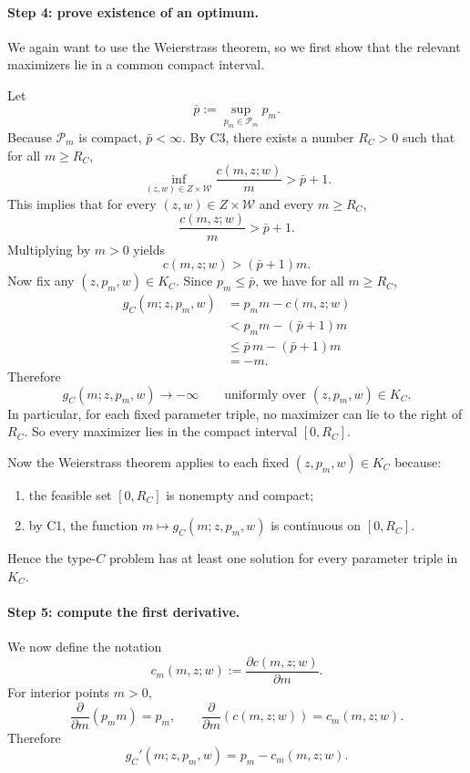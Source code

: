 \paragraph{Step 4: prove existence of an optimum.}
We again want to use the Weierstrass theorem, so we first show that the relevant maximizers lie in a common compact interval.

Let
\[
\bar p:=\sup_{p_m\in\mathcal P_m} p_m.
\]
Because $\mathcal P_m$ is compact, $\bar p<\infty$. By C3, there exists a number $R_C>0$ such that for all $m\ge R_C$,
\[
\inf_{(z,w)\in Z\times\mathcal W}\frac{c(m,z;w)}{m}>\bar p+1.
\]
This implies that for every $(z,w)\in Z\times\mathcal W$ and every $m\ge R_C$,
\[
\frac{c(m,z;w)}{m}>\bar p+1.
\]
Multiplying by $m>0$ yields
\[
c(m,z;w)>(\bar p+1)m.
\]
Now fix any $(z,p_m,w)\in K_C$. Since $p_m\le \bar p$, we have for all $m\ge R_C$,
\begin{align*}
g_C(m;z,p_m,w)
&=
p_m m-c(m,z;w)\\
&<
p_m m-(\bar p+1)m\\
&\le
\bar p\,m-(\bar p+1)m\\
&=
-m.
\end{align*}
Therefore
\[
g_C(m;z,p_m,w)\to -\infty
\qquad\text{uniformly over }(z,p_m,w)\in K_C.
\]
In particular, for each fixed parameter triple, no maximizer can lie to the right of $R_C$. So every maximizer lies in the compact interval $[0,R_C]$.

Now the Weierstrass theorem applies to each fixed $(z,p_m,w)\in K_C$ because:
\begin{enumerate}
    \item the feasible set $[0,R_C]$ is nonempty and compact;
    \item by C1, the function $m\mapsto g_C(m;z,p_m,w)$ is continuous on $[0,R_C]$.
\end{enumerate}
Hence the type-$C$ problem has at least one solution for every parameter triple in $K_C$.

\paragraph{Step 5: compute the first derivative.}
We now define the notation
\[
c_m(m,z;w):=\frac{\partial c(m,z;w)}{\partial m}.
\]
For interior points $m>0$,
\[
\frac{\partial}{\partial m}\left(p_m m\right)=p_m,
\qquad
\frac{\partial}{\partial m}\left(c(m,z;w)\right)=c_m(m,z;w).
\]
Therefore
\begin{equation}
g_C'(m;z,p_m,w)=p_m-c_m(m,z;w).
\label{eq:p2C_derivative_rev}
\end{equation}

